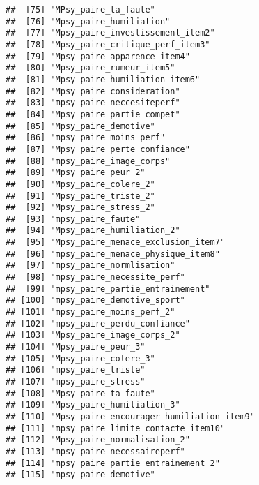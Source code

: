 \documentclass[
]{article}
\begin{document}
\begin{verbatim}
##  [75] "MPsy_paire_ta_faute"                                 
##  [76] "Mpsy_paire_humiliation"                              
##  [77] "Mpsy_paire_investissement_item2"                     
##  [78] "Mpsy_paire_critique_perf_item3"                      
##  [79] "Mpsy_paire_apparence_item4"                          
##  [80] "Mpsy_paire_rumeur_item5"                             
##  [81] "Mpsy_paire_humiliation_item6"                        
##  [82] "Mpsy_paire_consideration"                            
##  [83] "mpsy_paire_neccesiteperf"                            
##  [84] "Mpsy_paire_partie_compet"                            
##  [85] "Mpsy_paire_demotive"                                 
##  [86] "mpsy_paire_moins_perf"                               
##  [87] "Mpsy_paire_perte_confiance"                          
##  [88] "mpsy_paire_image_corps"                              
##  [89] "Mpsy_paire_peur_2"                                   
##  [90] "Mpsy_paire_colere_2"                                 
##  [91] "Mpsy_paire_triste_2"                                 
##  [92] "Mpsy_paire_stress_2"                                 
##  [93] "mpsy_paire_faute"                                    
##  [94] "Mpsy_paire_humiliation_2"                            
##  [95] "Mpsy_paire_menace_exclusion_item7"                   
##  [96] "mpsy_paire_menace_physique_item8"                    
##  [97] "mpsy_paire_normlisation"                             
##  [98] "mpsy_paire_necessite_perf"                           
##  [99] "mpsy_paire_partie_entrainement"                      
## [100] "mpsy_paire_demotive_sport"                           
## [101] "mpsy_paire_moins_perf_2"                             
## [102] "mpsy_paire_perdu_confiance"                          
## [103] "Mpsy_paire_image_corps_2"                            
## [104] "Mpsy_paire_peur_3"                                   
## [105] "Mpsy_paire_colere_3"                                 
## [106] "mpsy_paire_triste"                                   
## [107] "mpsy_paire_stress"                                   
## [108] "Mpsy_paire_ta_faute"                                 
## [109] "Mpsy_paire_humiliation_3"                            
## [110] "Mpsy_paire_encourager_humiliation_item9"             
## [111] "mpsy_paire_limite_contacte_item10"                   
## [112] "Mpsy_paire_normalisation_2"                          
## [113] "mpsy_paire_necessaireperf"                           
## [114] "mpsy_paire_partie_entrainement_2"                    
## [115] "mpsy_paire_demotive"                                 

\end{verbatim}
\end{document}
